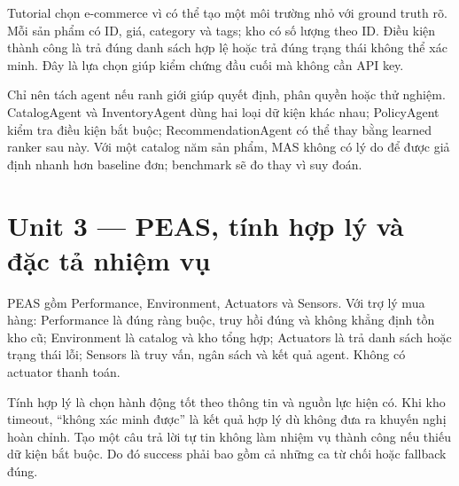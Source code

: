 Tutorial chọn e-commerce vì có thể tạo một môi trường nhỏ với ground
truth rõ. Mỗi sản phẩm có ID, giá, category và tags; kho có số lượng
theo ID. Điều kiện thành công là trả đúng danh sách hợp lệ hoặc trả đúng
trạng thái không thể xác minh. Đây là lựa chọn giúp kiểm chứng đầu cuối
mà không cần API key.

Chỉ nên tách agent nếu ranh giới giúp quyết định, phân quyền hoặc thử
nghiệm. CatalogAgent và InventoryAgent dùng hai loại dữ kiện khác nhau;
PolicyAgent kiểm tra điều kiện bắt buộc; RecommendationAgent có thể thay
bằng learned ranker sau này. Với một catalog năm sản phẩm, MAS không có
lý do để được giả định nhanh hơn baseline đơn; benchmark sẽ đo thay vì
suy đoán.

\section{Unit 3 --- PEAS, tính hợp lý và đặc tả nhiệm
vụ}\label{unit-3-peas-tuxednh-hux1ee3p-luxfd-vuxe0-ux111ux1eb7c-tux1ea3-nhiux1ec7m-vux1ee5}

PEAS gồm Performance, Environment, Actuators và Sensors. Với trợ lý mua
hàng: Performance là đúng ràng buộc, truy hồi đúng và không khẳng định
tồn kho cũ; Environment là catalog và kho tổng hợp; Actuators là trả
danh sách hoặc trạng thái lỗi; Sensors là truy vấn, ngân sách và kết quả
agent. Không có actuator thanh toán.

Tính hợp lý là chọn hành động tốt theo thông tin và nguồn lực hiện có.
Khi kho timeout, ``không xác minh được'' là kết quả hợp lý dù không đưa
ra khuyến nghị hoàn chỉnh. Tạo một câu trả lời tự tin không làm nhiệm vụ
thành công nếu thiếu dữ kiện bắt buộc. Do đó success phải bao gồm cả
những ca từ chối hoặc fallback đúng.

